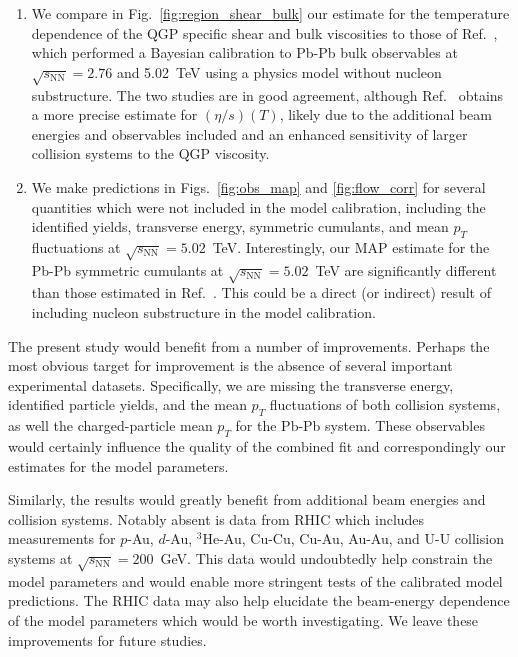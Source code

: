 \documentclass[aps,prc,reprint,amsmath,nofootinbib]{revtex4-1}
\newcommand{\sqrts}{\sqrt{s_\mathrm{NN}}}
\begin{document}
\begin{enumerate}[itemsep=0pt, leftmargin=2\parindent]
  \item
    We compare in Fig.~\ref{fig:region_shear_bulk} our estimate for the temperature dependence of the QGP specific shear and bulk viscosities to those of Ref.~\cite{Bernhard:2018hnz}, which performed a Bayesian calibration to Pb-Pb bulk observables at $\sqrts=2.76$ and 5.02~TeV using a physics model without nucleon substructure.
    The two studies are in good agreement, although Ref.~\cite{Bernhard:2018hnz} obtains a more precise estimate for $(\eta/s)(T)$, likely due to the additional beam energies and observables included and an enhanced sensitivity of larger collision systems to the QGP viscosity.
  \item
    We make predictions in Figs.~\ref{fig:obs_map} and \ref{fig:flow_corr} for several quantities which were not included in the model calibration, including the identified yields, transverse energy, symmetric cumulants, and mean $p_T$ fluctuations at $\sqrts=5.02$~TeV.
    Interestingly, our MAP estimate for the Pb-Pb symmetric cumulants at $\sqrts=5.02$~TeV are significantly different than those estimated in Ref.~\cite{Bernhard:2018hnz}.
    This could be a direct (or indirect) result of including nucleon substructure in the model calibration.
\end{enumerate}

The present study would benefit from a number of improvements.
Perhaps the most obvious target for improvement is the absence of several important experimental datasets.
Specifically, we are missing the transverse energy, identified particle yields, and the mean $p_T$ fluctuations of both collision systems, as well the charged-particle mean $p_T$ for the Pb-Pb system.
These observables would certainly influence the quality of the combined fit and correspondingly our estimates for the model parameters.

Similarly, the results would greatly benefit from additional beam energies and collision systems.
Notably absent is data from RHIC which includes measurements for $p$-Au, $d$-Au, $^3$He-Au, Cu-Cu, Cu-Au, Au-Au, and \mbox{U-U} collision systems at $\sqrts=200$~GeV.
This data would undoubtedly help constrain the model parameters and would enable more stringent tests of the calibrated model predictions.
The RHIC data may also help elucidate the beam-energy dependence of the model parameters which would be worth investigating.
We leave these improvements for future studies.

\medskip
\end{document}
